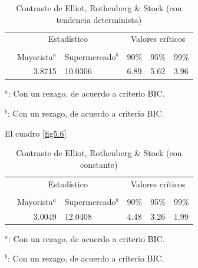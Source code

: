 \documentclass[12pt, twoside]{book}\usepackage[]{graphicx}\usepackage[]{color}
\numberwithin{equation}{section}
\numberwithin{theorem}{section}
\numberwithin{teorema}{section}
\numberwithin{defi}{section}
\numberwithin{prop}{section}
\numberwithin{defi}{section}
\theoremstyle{plain}
\begin{document}
\begin{table}[h]
\centering
\begin{threeparttable}
\caption{Contraste de Elliot, Rothenberg \& Stock (con tendencia determinista)\label{fig5.5}}
\begin{tabular}{@{}lrllll@{}}
\toprule
\multicolumn{1}{l}{} & \multicolumn{2}{c}{Estadístico} &
\multicolumn{3}{c}{Valores críticos} \\
\cmidrule(l){2-3} \cmidrule(l){4-6} \\
\multicolumn{1}{l}{} & \multicolumn{1}{c}{Mayorista$^{a}$} &
 \multicolumn{1}{c}{Supermercado$^{b}$} &
\multicolumn{1}{l}{90\%}&
\multicolumn{1}{l}{95\%}&
\multicolumn{1}{l}{99\%}
\\
\midrule
  & 3.8715 &  10.0306 & 6.89 & 5.62 & 3.96 \\
\bottomrule
\end{tabular}
\label{tab-8}
\begin{tablenotes}
\small 
\item $^{a}$: Con un rezago, de acuerdo a criterio BIC. 
\item $^{b}$: Con un rezago, de acuerdo a criterio BIC. 
\end{tablenotes}
\end{threeparttable}
\end{table}

El cuadro \ref{fig5.6}

\begin{table}[h]
\centering
\begin{threeparttable}
\caption{Contraste de Elliot, Rothenberg \& Stock (con constante)\label{fig5.6}}
\begin{tabular}{@{}lrllll@{}}
\toprule
\multicolumn{1}{l}{} & \multicolumn{2}{c}{Estadístico} &
\multicolumn{3}{c}{Valores críticos} \\
\cmidrule(l){2-3} \cmidrule(l){4-6} \\
\multicolumn{1}{l}{} & \multicolumn{1}{c}{Mayorista$^{a}$} &
 \multicolumn{1}{c}{Supermercado$^{b}$} &
\multicolumn{1}{l}{90\%}&
\multicolumn{1}{l}{95\%}&
\multicolumn{1}{l}{99\%}
\\
\midrule
  & 3.0049 &  12.0408 & 4.48 & 3.26 & 1.99 \\
\bottomrule
\end{tabular}
\label{tab-9}
\begin{tablenotes}
\small 
\item $^{a}$: Con un rezago, de acuerdo a criterio BIC. 
\item $^{b}$: Con un rezago, de acuerdo a criterio BIC. 
\end{tablenotes}
\end{threeparttable}
\end{table}
\end{document}
